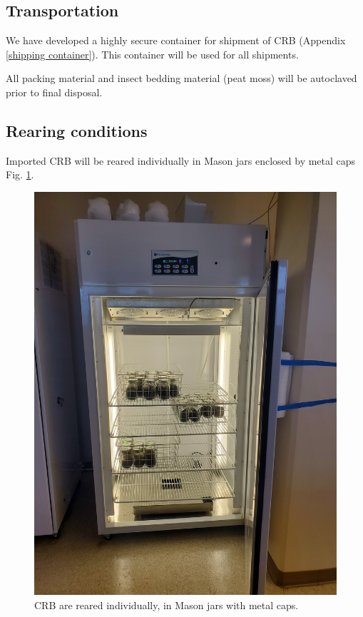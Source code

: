 \documentclass[12pt,english,letterpaper]{scrartcl}
\begin{document}
\subsection{Transportation}
We have developed a highly secure container for shipment of CRB (Appendix \ref{shipping container}). This container will be used for all shipments.

All packing material and insect bedding material (peat moss) will be autoclaved prior to final disposal.
	  	
\subsection{Rearing conditions}
Imported CRB will be reared individually in Mason jars enclosed by metal caps Fig. \ref{fig:jars}.
\begin{figure}[h]
	\centering
	\includegraphics[width=\textwidth, angle =-90]{jars.jpg}
	\caption{CRB are reared individually, in Mason jars with metal caps.}
	\label{fig:jars}
\end{figure}
\end{document}
